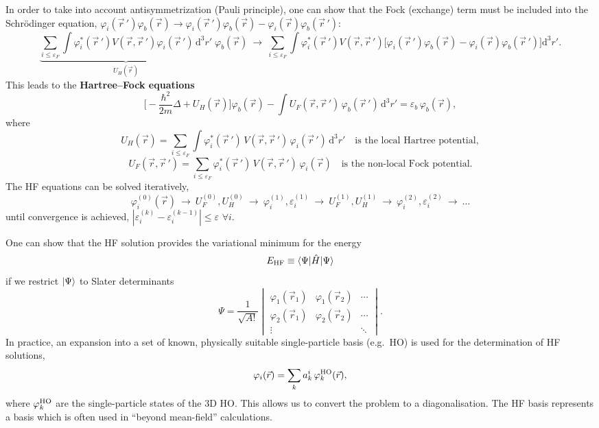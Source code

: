 \documentclass[11pt,a4paper]{article}
\newcommand{\op}[1]{\hat{#1}}
\newcommand{\ud}{\mathrm{d}}
\begin{document}
In order to take into account antisymmetrization (Pauli principle), one can show that the Fock (exchange) term must be included into the Schr\"odinger equation, $\varphi_i(\vec r\,')\varphi_b(\vec r)\to\varphi_i(\vec r\,')\varphi_b(\vec r)-\varphi_i(\vec r)\varphi_b(\vec r\,')$:
\[
\underbrace{\sum_{i\le\varepsilon_F}\int\varphi_i^*(\vec r\,')V(\vec r,\vec r\,')\varphi_i(\vec r\,')\,\ud^3r'}_{U_H(\vec r)}\;\varphi_b(\vec r)
\ \longrightarrow\
\sum_{i\le\varepsilon_F}\int\varphi_i^*(\vec r\,')V(\vec r,\vec r\,')\big[\varphi_i(\vec r\,')\varphi_b(\vec r)-\varphi_i(\vec r)\varphi_b(\vec r\,')\big]\ud^3r' .
\]
This leads to the \textbf{Hartree--Fock equations}
\[
\Big[-\frac{\hbar^2}{2m}\Delta+U_H(\vec r)\Big]\varphi_b(\vec r)-\int U_F(\vec r,\vec r\,')\,\varphi_b(\vec r\,')\,\ud^3r'=\varepsilon_b\,\varphi_b(\vec r),
\]
where
\[
U_H(\vec r)=\sum_{i\le\varepsilon_F}\int\varphi_i^*(\vec r\,')\,V(\vec r,\vec r\,')\,\varphi_i(\vec r\,')\,\ud^3r'
\quad\text{is the local Hartree potential},
\]
\[
U_F(\vec r,\vec r\,')=\sum_{i\le\varepsilon_F}\varphi_i^*(\vec r\,')\,V(\vec r,\vec r\,')\,\varphi_i(\vec r)
\quad\text{is the non-local Fock potential}.
\]
The HF equations can be solved iteratively,
\[
\varphi_i^{(0)}(\vec r)\ \to\ U_F^{(0)},U_H^{(0)}\ \to\ \varphi_i^{(1)},\varepsilon_i^{(1)}\ \to\ U_F^{(1)},U_H^{(1)}\ \to\ \varphi_i^{(2)},\varepsilon_i^{(2)}\ \to\ \dots
\]
until convergence is achieved, $|\varepsilon_i^{(k)}-\varepsilon_i^{(k-1)}|\le\varepsilon$ $\forall i$.

One can show that the HF solution provides the variational minimum for the energy
\[
E_{\rm HF}\equiv\braket{\Psi|\op H|\Psi}
\]
if we restrict $\ket\Psi$ to Slater determinants
\[
\Psi=\frac{1}{\sqrt{A!}}
\begin{vmatrix}
\varphi_1(\vec r_1)&\varphi_1(\vec r_2)&\cdots\\
\varphi_2(\vec r_1)&\varphi_2(\vec r_2)&\cdots\\
\vdots&&\ddots
\end{vmatrix}.
\]
In practice, an expansion into a set of known, physically suitable single-particle basis (e.g.\ HO) is used for the determination of HF solutions,
\[
\varphi_i(\vec r)=\sum_k a^i_k\,\varphi^{\rm HO}_k(\vec r),
\]
where $\varphi^{\rm HO}_k$ are the single-particle states of the 3D HO. This allows us to convert the problem to a diagonalisation. The HF basis represents a basis which is often used in ``beyond mean-field'' calculations.

\end{document}
